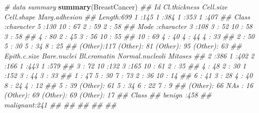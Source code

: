\documentclass[
]{book}
\newenvironment{Shaded}{\begin{snugshade}}{\end{snugshade}}
\newcommand{\CommentTok}[1]{\textcolor[rgb]{0.56,0.35,0.01}{\textit{#1}}}
\newcommand{\KeywordTok}[1]{\textcolor[rgb]{0.13,0.29,0.53}{\textbf{#1}}}
\newcommand{\NormalTok}[1]{#1}
\theoremstyle{definition}
\theoremstyle{definition}
\theoremstyle{definition}
\theoremstyle{remark}
\begin{document}
\begin{Shaded}
\begin{Highlighting}[]
\CommentTok{\# data summary}
\KeywordTok{summary}\NormalTok{(BreastCancer)}
\CommentTok{\#\#       Id             Cl.thickness   Cell.size     Cell.shape  Marg.adhesion}
\CommentTok{\#\#  Length:699         1      :145   1      :384   1      :353   1      :407  }
\CommentTok{\#\#  Class :character   5      :130   10     : 67   2      : 59   2      : 58  }
\CommentTok{\#\#  Mode  :character   3      :108   3      : 52   10     : 58   3      : 58  }
\CommentTok{\#\#                     4      : 80   2      : 45   3      : 56   10     : 55  }
\CommentTok{\#\#                     10     : 69   4      : 40   4      : 44   4      : 33  }
\CommentTok{\#\#                     2      : 50   5      : 30   5      : 34   8      : 25  }
\CommentTok{\#\#                     (Other):117   (Other): 81   (Other): 95   (Other): 63  }
\CommentTok{\#\#   Epith.c.size  Bare.nuclei   Bl.cromatin  Normal.nucleoli    Mitoses   }
\CommentTok{\#\#  2      :386   1      :402   2      :166   1      :443     1      :579  }
\CommentTok{\#\#  3      : 72   10     :132   3      :165   10     : 61     2      : 35  }
\CommentTok{\#\#  4      : 48   2      : 30   1      :152   3      : 44     3      : 33  }
\CommentTok{\#\#  1      : 47   5      : 30   7      : 73   2      : 36     10     : 14  }
\CommentTok{\#\#  6      : 41   3      : 28   4      : 40   8      : 24     4      : 12  }
\CommentTok{\#\#  5      : 39   (Other): 61   5      : 34   6      : 22     7      :  9  }
\CommentTok{\#\#  (Other): 66   NA\textquotesingle{}s   : 16   (Other): 69   (Other): 69     (Other): 17  }
\CommentTok{\#\#        Class    }
\CommentTok{\#\#  benign   :458  }
\CommentTok{\#\#  malignant:241  }
\CommentTok{\#\#                 }
\CommentTok{\#\#                 }
\CommentTok{\#\#                 }
\CommentTok{\#\#                 }
\CommentTok{\#\# }


\end{Highlighting}
\end{Shaded}
\end{document}
